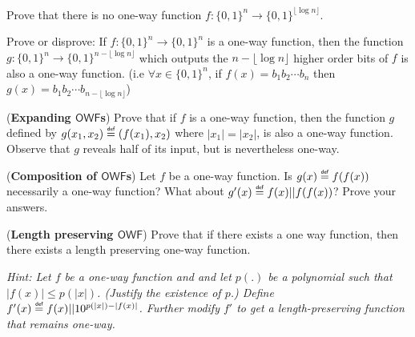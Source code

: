 \documentclass[11pt]{exam}
\newcommand{\bool}{\{0,1\}}
\newcommand{\owf}{\mathsf{OWF}}
\newcommand\myeq{\mathrel{\overset{\makebox[0pt]{\mbox{\normalfont\tiny\sffamily def}}}{=}}}
\begin{document}
\begin{questions}

\question[10] 
Prove that there is no one-way function $f\colon\bool^n\to \bool^{\lfloor \log n \rfloor}$.
\question[10]

Prove or disprove: If $f:\bool^n\to\bool^n$ is a one-way function, then the function $g:\bool^n\to\bool^{n-\lfloor \log n \rfloor}$ which outputs the $n-\lfloor \log n \rfloor$ higher order bits of $f$ is also a one-way function. (i.e $\forall x \in \bool^n$, if $f(x)=b_1b_2\cdots b_n$ then $g(x)=b_1b_2\cdots b_{n-\lfloor \log n \rfloor}$)

\question[10]({\bf Expanding $\owf$s}) Prove that if $f$ is a one-way function, then the function $g$ defined by $g(x_1,x_2)\myeq\left(f(x_1),x_2\right)$ where $|x_1|=|x_2|$, is also a one-way function. Observe that $g$ reveals half of its input, but is nevertheless one-way.

\question[10]({\bf Composition of $\owf$s}) Let $f$ be a one-way function. Is $g(x)\myeq f(f(x))$ necessarily a one-way function? What about $g'(x)\myeq f(x)||f(f(x))$? Prove your answers.

\question[10]({\bf Length preserving $\owf$}) Prove that if there exists a one way function, then there exists a length preserving one-way function.

\emph{Hint: Let $f$ be a one-way function and and let $p(.)$ be a polynomial such that $|f(x)|\leq p(|x|)$. (Justify the existence of $p$.) Define $f'(x)\myeq f(x)||10^{p(|x|)-|f(x)|}$. Further modify $f'$ to get a length-preserving function that remains one-way.}

\end{questions}
\end{document}
